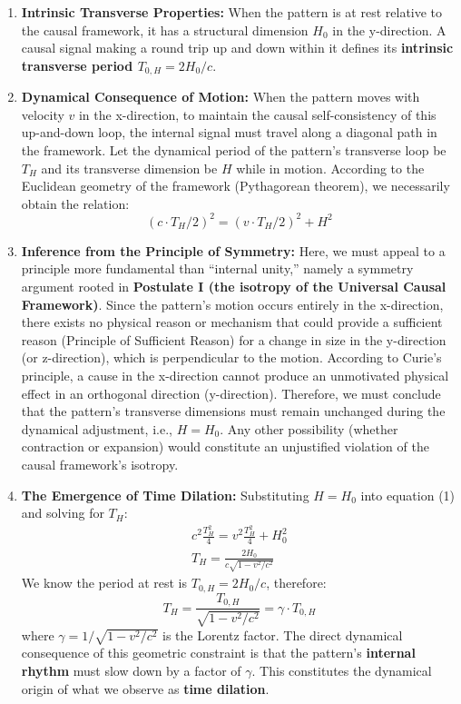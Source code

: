 \documentclass[11pt, a4paper]{article}
\begin{document}
\begin{enumerate}
    \item \textbf{Intrinsic Transverse Properties:} When the pattern is at rest relative to the causal framework, it has a structural dimension $H_0$ in the y-direction. A causal signal making a round trip up and down within it defines its \textbf{intrinsic transverse period $T_{0,H} = 2H_0 / c$}.
    \item \textbf{Dynamical Consequence of Motion:} When the pattern moves with velocity $v$ in the x-direction, to maintain the causal self-consistency of this up-and-down loop, the internal signal must travel along a diagonal path in the framework. Let the dynamical period of the pattern's transverse loop be $T_H$ and its transverse dimension be $H$ while in motion. According to the Euclidean geometry of the framework (Pythagorean theorem), we necessarily obtain the relation:
    \begin{equation}
        (c \cdot T_H / 2)^2 = (v \cdot T_H / 2)^2 + H^2
    \end{equation}
    \item \textbf{Inference from the Principle of Symmetry:} Here, we must appeal to a principle more fundamental than ``internal unity,'' namely a symmetry argument rooted in \textbf{Postulate I (the isotropy of the Universal Causal Framework)}. Since the pattern's motion occurs entirely in the x-direction, there exists no physical reason or mechanism that could provide a sufficient reason (Principle of Sufficient Reason) for a change in size in the y-direction (or z-direction), which is perpendicular to the motion. According to Curie's principle, a cause in the x-direction cannot produce an unmotivated physical effect in an orthogonal direction (y-direction). Therefore, we must conclude that the pattern's transverse dimensions must remain unchanged during the dynamical adjustment, i.e., $H = H_0$. Any other possibility (whether contraction or expansion) would constitute an unjustified violation of the causal framework's isotropy.
    \item \textbf{The Emergence of Time Dilation:} Substituting $H = H_0$ into equation (1) and solving for $T_H$:
    \begin{gather}
        c^2 \frac{T_H^2}{4} = v^2 \frac{T_H^2}{4} + H_0^2 \\
        T_H = \frac{2 H_0}{c\sqrt{1 - v^2/c^2}}
    \end{gather}
    We know the period at rest is $T_{0,H} = 2H_0/c$, therefore:
    \begin{equation}
        T_H = \frac{T_{0,H}}{\sqrt{1 - v^2/c^2}} = \gamma \cdot T_{0,H}
    \end{equation}
    where $\gamma = 1 / \sqrt{1 - v^2/c^2}$ is the Lorentz factor. The direct dynamical consequence of this geometric constraint is that the pattern's \textbf{internal rhythm} must slow down by a factor of $\gamma$. This constitutes the dynamical origin of what we observe as \textbf{time dilation}.
\end{enumerate}
\end{document}

